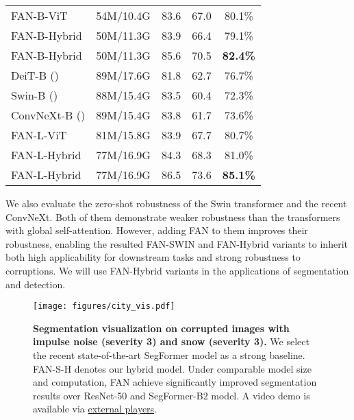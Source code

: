 \documentclass[nohyperref]{article}
\theoremstyle{plain}
\theoremstyle{definition}
\theoremstyle{remark}
\begin{document}
\begin{table}[h]
{\begin{tabular}{l|cccc}
     \midrule
         FAN-B-ViT  &  54M/10.4G  & 83.6 &  67.0  & 80.1\% 
     \\ 
         FAN-B-Hybrid  &  50M/11.3G  & 83.9 &  66.4  & 79.1\% 
     \\ 
         FAN-B-Hybrid  &  50M/11.3G  & 85.6 &  70.5  & \textbf{82.4\%} 
     \\ 
    \midrule
         DeiT-B (\citeauthor{touvron2021training})  &  89M/17.6G  & 81.8 &  62.7  &  76.7\% 
     \\ 
         Swin-B (\citeauthor{liu2021swin})  &  88M/15.4G  & 83.5 &  60.4  & 72.3\% 
     \\ 
         ConvNeXt-B (\citeauthor{liu2022convnet})  &  89M/15.4G & 83.8  & 61.7 &  73.6\%
     \\ 
     \midrule
         FAN-L-ViT  &  81M/15.8G  & 83.9 &  67.7  & 80.7\% 
     \\ 
         FAN-L-Hybrid  &  77M/16.9G  & 84.3 &  68.3  & {81.0\%} 
     \\ 
         FAN-L-Hybrid  &  77M/16.9G  & 86.5 &  73.6  & \textbf{85.1\%} 
     \\ 
    \bottomrule
    \end{tabular}
    }
\vspace{-6mm}
\end{table}

We also evaluate the zero-shot robustness of the Swin transformer and the recent ConvNeXt. Both of them demonstrate weaker robustness than the transformers with global self-attention. However, adding FAN to them improves their robustness, enabling  the resulted FAN-SWIN and FAN-Hybrid variants to inherit both high  applicability for downstream tasks  and strong robustness to corruptions. We will use FAN-Hybrid variants in the applications of segmentation and detection.

\begin{figure*}[t] 
\centering
\texttt{[image: figures/city\_vis.pdf]}
\vspace{-5mm}
\caption{\textbf{Segmentation visualization on corrupted images with impulse noise (severity 3) and snow (severity 3).} We select the recent state-of-the-art SegFormer model \cite{xie2021segformer} as a strong baseline. FAN-S-H denotes our hybrid model. Under comparable model size and computation, FAN achieve significantly improved segmentation results over ResNet-50 and SegFormer-B2 model. A video demo is available via \href{https://drive.google.com/file/d/1A9Roe7SanJV145qh481nDpf5JAmiJ-Fl/view?usp=sharing}{external players}.}

\label{fig:segmentation_vis}
\vspace{-5mm}
\end{figure*}
\end{document}
